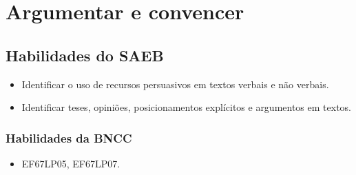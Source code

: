 \chapter{Argumentar e convencer}

\section*{Habilidades do SAEB}

\begin{itemize}

  \item Identificar o uso de recursos persuasivos em textos verbais e não verbais.

  \item Identificar teses, opiniões, posicionamentos explícitos e argumentos em textos.

\end{itemize}

\subsection{Habilidades da BNCC} 

\begin{itemize}

  \item EF67LP05, EF67LP07.

\end{itemize}

